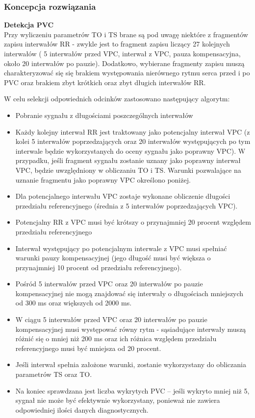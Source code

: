 \documentclass[a4paper, 11pt]{article}
\begin{document}
\subsubsection{Koncepcja rozwiązania}
\label{sec:hrt:procs}

\textbf{Detekcja PVC}\\
Przy wyliczeniu parametrów TO i TS brane są pod uwagę niektóre z fragmentów zapisu interwałów RR - zwykle jest to fragment zapisu liczący 27 kolejnych 
interwałów ( 5 interwałów przed VPC, interwał z VPC, pauza kompensacyjna,
około 20 interwałów po pauzie). Dodatkowo, wybierane fragmenty zapisu muszą  charakteryzować się się brakiem występowania nierównego rytmu serca przed i po PVC oraz brakiem zbyt krótkich oraz zbyt długich interwałów RR.
\par W celu selekcji odpowiednich odcinków zastosowano następujący algorytm:
\begin{itemize}
\item Pobranie sygnału z długościami poszczególnych interwałów
\item Każdy kolejny interwał RR jest traktowany jako
potencjalny interwał VPC (z kolei 5 interwałów poprzedzających oraz 20 interwałów występujących po tym interwale będzie wykorzystanych do oceny
sygnału jako poprawny VPC). 
W przypadku, jeśli fragment sygnału zostanie uznany jako poprawny
interwał VPC, będzie uwzględniony w obliczaniu TO i TS.
Warunki pozwalające na uznanie fragmentu jako poprawny VPC określono poniżej.
\item Dla potencjalnego interwału VPC zostaje wykonane obliczenie długości przedziału referencyjnego 
(średnia z  5 interwałów poprzedzających VPC).
\item Potencjalny RR z VPC musi być 
krótszy o przynajmniej 20 procent względem przedziału referencyjnego
\item Interwał występujący po potencjalnym interwale z VPC musi spełniać 
warunki pauzy kompensacyjnej (jego długość musi być większa o przynajmniej 10 procent od przedziału referencyjnego).
\item Pośród 5 interwałów przed VPC
oraz 20 interwałów po pauzie kompensacyjnej nie mogą znajdować się
interwały o długościach
mniejszych od 300 ms oraz większych od 2000 ms.
\item W ciągu 5 interwałów przed VPC
oraz 20 interwałów po pauzie kompensacyjnej musi występować
równy rytm - sąsiadujące interwały muszą różnić się o mniej
niż 200 ms oraz ich różnica względem przedziału referencyjnego musi być mniejsza
od 20 procent.
\item Jeśli interwał spełnia założone warunki, zostanie 
wykorzystany do obliczania parametrów TS oraz TO.
\item Na koniec sprawdzana jest liczba wykrytych 
PVC -- jeśli wykryto mniej niż 5, sygnał nie może być efektywnie 
wykorzystany, ponieważ nie zawiera odpowiedniej ilości
danych diagnostycznych. 
\end{itemize}
\end{document}
